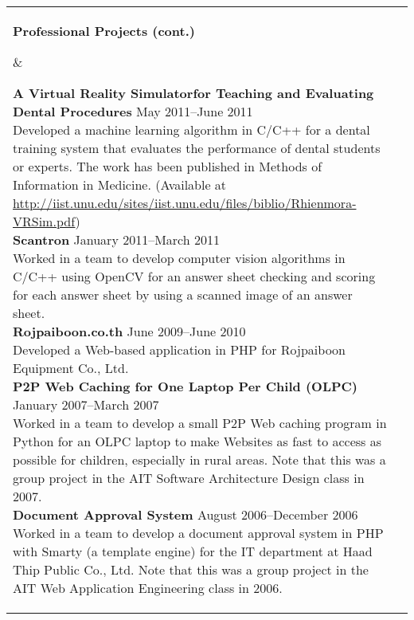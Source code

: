 \documentclass[11pt]{article}
\makeatletter
\newcommand{\mysection}[2]{
  \noindent
  \begin{tabular}{@{}ll@{}}
    \parbox[t]{1.0in}{ \raggedright \bf #1 } &
    \parbox[t]{5.0in}{ #2 }\\
    \hspace{0.2in}
  \end{tabular}
}
\makeatother
\begin{document}
\mysection{Professional Projects (cont.)}{

  {\bf A Virtual Reality Simulatorfor Teaching and Evaluating Dental
  Procedures} \hfill May 2011--June 2011\\ 
  Developed a machine learning algorithm in C/C++ for a dental training 
  system that evaluates the performance of dental students or experts.
  The work has been published in Methods of Information in Medicine. 
  (Available at
  \url{http://iist.unu.edu/sites/iist.unu.edu/files/biblio/Rhienmora-VRSim.pdf})\\

  {\bf Scantron} \hfill January 2011--March 2011 \\
  Worked in a team to develop computer vision algorithms in C/C++ 
  using OpenCV for an answer sheet checking and scoring for each 
  answer sheet by using a scanned image of an answer sheet.\\

  {\bf Rojpaiboon.co.th} \hfill June 2009--June 2010\\
  Developed a Web-based application in PHP for Rojpaiboon Equipment 
  Co., Ltd.\\

  {\bf P2P Web Caching for One Laptop Per Child (OLPC)} \hfill 
  January 2007--March 2007\\
  Worked in a team to develop a small P2P Web caching program in 
  Python for an OLPC laptop to make Websites as fast to access 
  as possible for children, especially in rural areas.
  Note that this was a group project in the AIT Software Architecture 
  Design class in 2007.\\

  {\bf Document Approval System} \hfill August 2006--December 2006\\
  Worked in a team to develop a document approval system in PHP 
  with Smarty (a template engine) for the IT department at Haad Thip 
  Public Co., Ltd. Note that this was a group project in the AIT Web 
  Application Engineering class in 2006.

}
\end{document}
